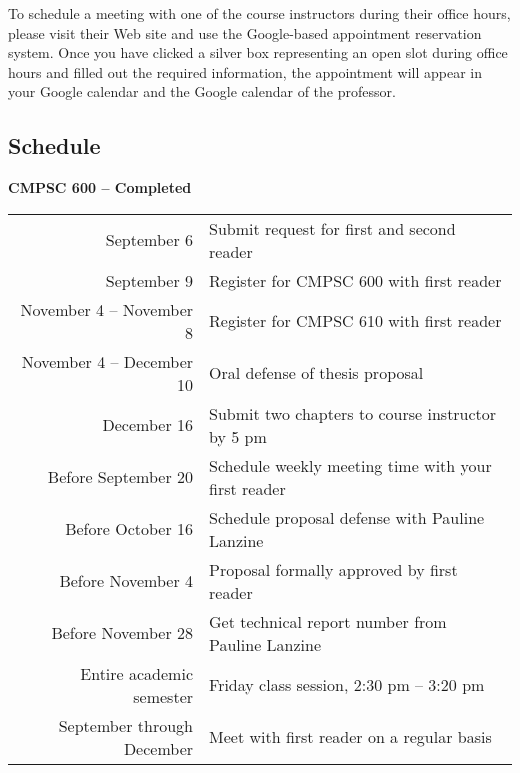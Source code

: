 \noindent To schedule a meeting with one of the course instructors during their office hours, please visit their Web site
and use the Google-based appointment reservation system.  Once you have clicked a silver box representing an open slot
during office hours and filled out the required information, the appointment will appear in your Google calendar and the
Google calendar of the professor.

\vspace*{-.1in}
\subsection*{Schedule}

{\bf CMPSC 600 -- Completed}
\begin{center}
\begin{tabular}{r|l}
\hline
September 6 & Submit request for first and second reader \\ 
September 9 & Register for CMPSC 600 with first reader \\ 
November 4 -- November 8 & Register for CMPSC 610 with first reader \\
November 4 -- December 10 & Oral defense of thesis proposal \\
December 16 & Submit two chapters to course instructor by 5 pm\\
\hline
Before September 20 & Schedule weekly meeting time with your first reader \\
Before October 16 & Schedule proposal defense with Pauline Lanzine \\
Before November 4 & Proposal formally approved by first reader \\
Before November 28 & Get technical report number from Pauline Lanzine\\
\hline
Entire academic semester & Friday class session, 2:30 pm -- 3:20 pm \\
September through December & Meet with first reader on a regular basis \\
\hline
\end{tabular}
\end{center}


